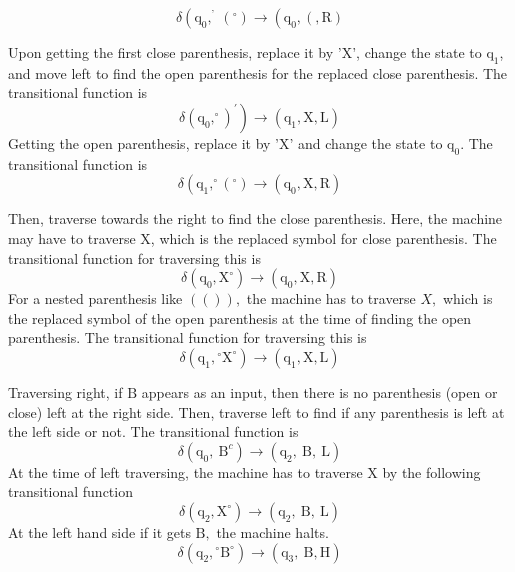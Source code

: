 \documentclass[8pt]{report}
\begin{document}
$$
\delta\left(\mathrm{q}_{0},^{\text {' }}\left(^{\circ}\right) \rightarrow\left(\mathrm{q}_{0},(, \mathrm{R})\right.\right.
$$

Upon getting the first close parenthesis, replace it by 'X', change the state to $\mathrm{q}_{1}$, and move left to find the open parenthesis for the replaced close parenthesis. The transitional function is
$$
\left.\delta\left(\mathrm{q}_{0},^{\circ}\right)^{\prime}\right) \rightarrow\left(\mathrm{q}_{1}, \mathrm{X}, \mathrm{L}\right)
$$
Getting the open parenthesis, replace it by 'X' and change the state to $\mathrm{q}_{0} .$ The transitional function is
$$
\delta\left(\mathrm{q}_{1},^{\circ}\left(^{\circ}\right) \rightarrow\left(\mathrm{q}_{0}, \mathrm{X}, \mathrm{R}\right)\right.
$$

Then, traverse towards the right to find the close parenthesis. Here, the machine may have to traverse $\mathrm{X}$, which is the replaced symbol for close parenthesis. The transitional function for traversing this is
$$
\delta\left(\mathrm{q}_{0}, \mathrm{X}^{\circ}\right) \rightarrow\left(\mathrm{q}_{0}, \mathrm{X}, \mathrm{R}\right)
$$
For a nested parenthesis like $(()),$ the machine has to traverse $X,$ which is the replaced symbol of the open parenthesis at the time of finding the open parenthesis. The transitional function for traversing this is
$$
\delta\left(\mathrm{q}_{1},{ }^{\circ} \mathrm{X}^{\circ}\right) \rightarrow\left(\mathrm{q}_{1}, \mathrm{X}, \mathrm{L}\right)
$$

Traversing right, if $\mathrm{B}$ appears as an input, then there is no parenthesis (open or close) left at the right side. Then, traverse left to find if any parenthesis is left at the left side or not. The transitional function is
$$
\delta\left(\mathrm{q}_{0}, \mathrm{~B}^{c}\right) \rightarrow\left(\mathrm{q}_{2}, \mathrm{~B}, \mathrm{~L}\right)
$$
At the time of left traversing, the machine has to traverse $\mathrm{X}$ by the following transitional function
$$
\delta\left(\mathrm{q}_{2}, \mathrm{X}^{\circ}\right) \rightarrow\left(\mathrm{q}_{2}, \mathrm{~B}, \mathrm{~L}\right)
$$
At the left hand side if it gets $\mathrm{B},$ the machine halts.
$$
\delta\left(\mathrm{q}_{2},{ }^{\circ} \mathrm{B}^{\circ}\right) \rightarrow\left(\mathrm{q}_{3}, \mathrm{~B}, \mathrm{H}\right)
$$

  
\end{document}

